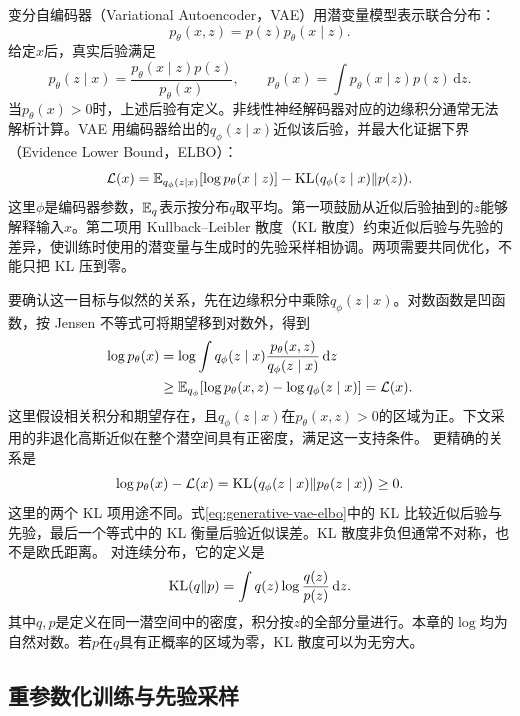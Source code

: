 变分自编码器（Variational Autoencoder，VAE）用潜变量模型表示联合分布：
\begin{equation}
p_{\theta}(x,z)=p(z)p_{\theta}(x\mid z).
\end{equation}
给定$x$后，真实后验满足
\[
p_{\theta}(z\mid x)=\frac{p_{\theta}(x\mid z)p(z)}{p_{\theta}(x)},\qquad
p_{\theta}(x)=\int p_{\theta}(x\mid z)p(z)\,\mathrm dz.
\]
当$p_\theta(x)>0$时，上述后验有定义。非线性神经解码器对应的边缘积分通常无法解析计算。VAE 用编码器给出的$q_{\phi}(z\mid x)$近似该后验，并最大化证据下界（Evidence Lower Bound，ELBO）：
\begin{equation}
\mathcal L(x)=\mathbb{E}_{q_{\phi}(z\mid x)}[\log p_{\theta}(x\mid z)]-\operatorname{KL}(q_{\phi}(z\mid x)\|p(z)).
\label{eq:generative-vae-elbo}
\end{equation}
这里$\phi$是编码器参数，$\mathbb{E}_q$表示按分布$q$取平均。第一项鼓励从近似后验抽到的$z$能够解释输入$x$。第二项用 Kullback--Leibler 散度（KL 散度）约束近似后验与先验的差异，使训练时使用的潜变量与生成时的先验采样相协调。两项需要共同优化，不能只把 KL 压到零。

要确认这一目标与似然的关系，先在边缘积分中乘除$q_\phi(z\mid x)$。对数函数是凹函数，按 Jensen 不等式可将期望移到对数外，得到
\begin{align}
\log p_{\theta}(x)
&=\log\int q_{\phi}(z\mid x)\frac{p_{\theta}(x,z)}{q_{\phi}(z\mid x)}\,\mathrm dz\\
&\geq \mathbb{E}_{q_{\phi}}[\log p_{\theta}(x,z)-\log q_{\phi}(z\mid x)]
=\mathcal L(x).
\end{align}
这里假设相关积分和期望存在，且$q_{\phi}(z\mid x)$在$p_{\theta}(x,z)>0$的区域为正。下文采用的非退化高斯近似在整个潜空间具有正密度，满足这一支持条件。
更精确的关系是
\begin{equation}
\log p_{\theta}(x)-\mathcal L(x)=\operatorname{KL}\bigl(q_{\phi}(z\mid x)\|p_{\theta}(z\mid x)\bigr)\geq0.
\end{equation}
这里的两个 KL 项用途不同。式\eqref{eq:generative-vae-elbo}中的 KL 比较近似后验与先验，最后一个等式中的 KL 衡量后验近似误差。KL 散度非负但通常不对称，也不是欧氏距离。
对连续分布，它的定义是
\[
\operatorname{KL}(q\|p)=\int q(z)\log\frac{q(z)}{p(z)}\,\mathrm dz.
\]
其中$q,p$是定义在同一潜空间中的密度，积分按$z$的全部分量进行。本章的$\log$均为自然对数。若$p$在$q$具有正概率的区域为零，KL 散度可以为无穷大。

\subsection{重参数化训练与先验采样}

